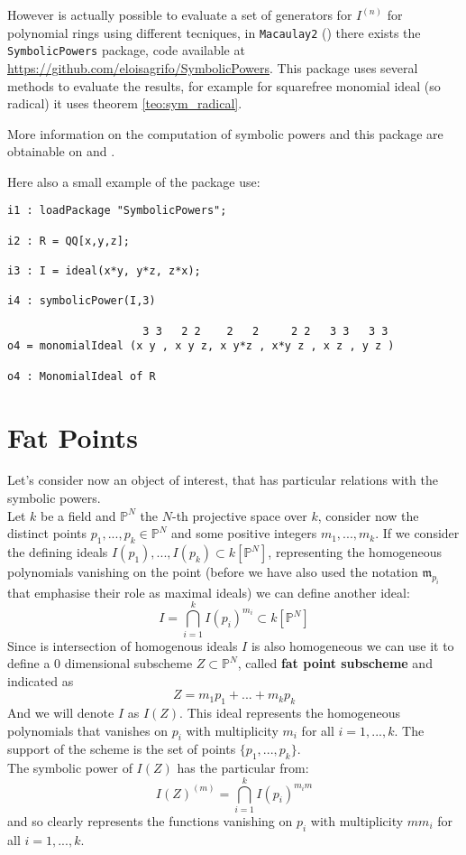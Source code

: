 \documentclass[notitlepage, a4]{book}
\theoremstyle{plain}
\theoremstyle{remark}
\theoremstyle{definition}
\newcommand{\PP}{\mathbb{P}}
\newcommand{\mm}{\mathfrak{m}}
\newcounter{que}
\begin{document}
However is actually possible to evaluate a set of generators for $ I^{(n)} $ for polynomial rings using different tecniques, in \verb|Macaulay2| (\cite{M2}) there exists the \verb|SymbolicPowers| package, code available at \linebreak \href{https://github.com/eloisagrifo/SymbolicPowers}{https://github.com/eloisagrifo/SymbolicPowers}. This package uses several methods to evaluate the results, for example for squarefree monomial ideal (so radical) it uses theorem \ref{teo:sym_radical}. 

More information on the computation of symbolic powers and this package are obtainable on \cite{Grifo18Symb} and \cite{Grifo17computation}. 


Here also a small example of the package use:

\begin{lstlisting}[language = Macaulay2]
i1 : loadPackage "SymbolicPowers"; 

i2 : R = QQ[x,y,z];

i3 : I = ideal(x*y, y*z, z*x);

i4 : symbolicPower(I,3)

                     3 3   2 2    2   2     2 2   3 3   3 3
o4 = monomialIdeal (x y , x y z, x y*z , x*y z , x z , y z )

o4 : MonomialIdeal of R

\end{lstlisting}


\section{Fat Points}

Let's consider now an object of interest, that has particular relations with the symbolic powers.\\
Let $ k $ be a field and $ \PP^N$ the $ N $-th projective space over $ k $, consider now the distinct points 
$ p_1, ... ,p_k \in  \PP^N$ and some positive integers $ m_1 , ... ,m_k $. If we consider the defining ideals $ I(p_1), ... , I(p_k)  \subset k [\PP^N]$, representing the homogeneous polynomials vanishing on the point (before we have also used the notation $ \mm_{p_i}$ that emphasise their role as maximal ideals) we can define another ideal:
\begin{equation}\label{eq:fat_pt}
	I = \bigcap_{i=1}^k I(p_i)^{m_i} \subset k [\PP^N]
\end{equation}
Since is intersection of homogenous ideals $ I $ is also homogeneous we can use it to define a $ 0 $ dimensional subscheme $ Z \subset \PP^N $, called \textbf{fat point subscheme} and indicated as 
\[
Z = m_1 p_1 + ... +  m_k p_k
\]
And we will denote $ I $ as $ I(Z) $. This ideal represents the homogeneous polynomials that vanishes on $ p_i $ with multiplicity $ m_i $ for all $ i = 1, ... , k $. The support of the scheme is the set of points $ \{ p_1 , ... , p_k\} $.\\
The symbolic power of $ I(Z) $ has the particular from:
\[
I(Z)^{(m)} = \bigcap_{i=1}^k I(p_i)^{m_im}
\]
and so clearly represents the functions vanishing on $ p_i $ with multiplicity $ mm_i $ for all $ i = 1, ... , k $. 
\end{document}

